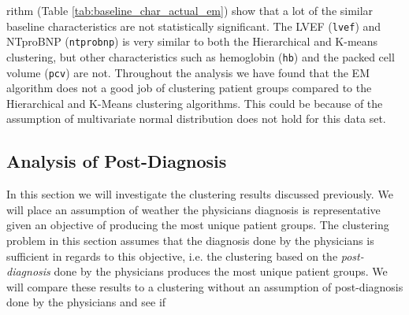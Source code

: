\documentclass[../thesis.tex]{subfiles}
\begin{document}


\noindent rithm (Table \ref{tab:baseline_char_actual_em}) show that a lot of the similar baseline characteristics are not statistically significant. The LVEF (\texttt{lvef}) and NTproBNP (\texttt{ntprobnp}) is very similar to both the Hierarchical and K-means clustering, but other characteristics such as hemoglobin (\texttt{hb}) and the packed cell volume (\texttt{pcv}) are not. Throughout the analysis we have found that the EM algorithm does not a good job of clustering patient groups compared to the Hierarchical and K-Means clustering algorithms. This could be because of the assumption of multivariate normal distribution does not hold for this data set.

\subsection{Analysis of Post-Diagnosis}

\noindent In this section we will investigate the clustering results discussed previously. We will place an assumption of weather the physicians diagnosis is representative given an objective of producing the most unique patient groups. The clustering problem in this section assumes that the diagnosis done by the physicians is sufficient in regards to this objective, i.e. the clustering based on the \textit{post-diagnosis} done by the physicians produces the most unique patient groups. We will compare these results to a clustering without an assumption of post-diagnosis done by the physicians and see if 


\end{document}
